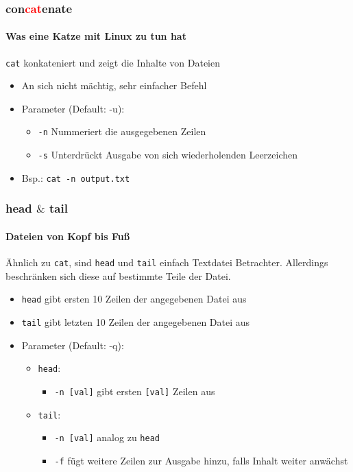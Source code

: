 \documentclass[12pt,utf8, handout]{beamer}
\begin{document}
\begin{frame}
\frametitle{con\textcolor{red}{cat}enate}
\framesubtitle{\textcolor{ownDarkOr}{Was eine Katze mit Linux zu tun hat}}
\texttt{cat} konkateniert und zeigt die Inhalte von Dateien
\begin{itemize}[<+->]
	\item An sich nicht mächtig, sehr einfacher Befehl
	\item Parameter (Default: -u):
	\begin{itemize}
		\item \texttt{-n} Nummeriert die ausgegebenen Zeilen 
		\item \texttt{-s} Unterdrückt Ausgabe von sich wiederholenden Leerzeichen
	\end{itemize}
	\item Bsp.: \texttt{cat -n output.txt}
\end{itemize}
\end{frame}

\begin{frame}
\frametitle{head $\&$ tail}
\framesubtitle{\textcolor{ownDarkOr}{Dateien von Kopf bis Fuß}}
Ähnlich zu \texttt{cat}, sind \texttt{head} und \texttt{tail} einfach Textdatei Betrachter. Allerdings beschränken sich diese auf bestimmte Teile der Datei.
\begin{itemize}
	\item \texttt{head} gibt ersten 10 Zeilen der angegebenen Datei aus
	\item \texttt{tail} gibt letzten 10 Zeilen der angegebenen Datei aus
	\item Parameter (Default: -q):
	\begin{itemize}
		\item \texttt{head}:
		\begin{itemize}[<+->]
			\item {\scriptsize \texttt{-n [val]} gibt ersten \texttt{[val]} Zeilen aus }
		\end{itemize}
		\item \texttt{tail}:
		\begin{itemize}[<+->]
			\item {\scriptsize \texttt{-n [val]} analog zu \texttt{head}}
			\item {\scriptsize \texttt{-f} fügt weitere Zeilen zur Ausgabe hinzu, falls Inhalt weiter anwächst}
		\end{itemize}
	\end{itemize}
\end{itemize}
\end{frame}
\end{document}
